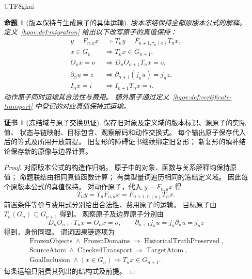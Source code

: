 \documentclass[12pt,a4paper,openany,notitlepage]{report}
\theoremstyle{plain}
\newtheorem{proposition}[theorem]{命题}
\theoremstyle{definition}
\newtheorem*{certificate}{证书}
\theoremstyle{remark}
\begin{document}
\begin{CJK*}{UTF8}{gkai}
\begin{proposition}[版本保持与生成原子的具体运输]
\label{hgov:prop:atomic-transport}
版本冻结保持全部原版本公式的解释。
定义~\ref{hgov:def:migration} 给出以下改写原子的真值保持：
\[
 \begin{aligned}
 y=F_{n,a}x
 &\Longrightarrow T_ny=F_{n+1,\tau_n(a)}T_nx,\\
 x\in G_n&\Longrightarrow T_nx\in G_{n+1},\\
 O_nx=o&\Longrightarrow D_nO_{n+1}T_nx=o,\\
 \partial_nu=z
 &\Longrightarrow \partial_{n+1}(j_nu)=j_nz,\\
 I_nx=i&\Longrightarrow I_{n+1}T_nx=i .
 \end{aligned}
\]
动作原子同时运输其合法性与费用。
额外原子通过定义~\ref{hgov:def:certificate-transport} 中登记的对应真值保持式运输。
\end{proposition}
\begin{certificate}[冻结域与原子交换见证]
保存旧对象及定义域的版本标识、源原子的实际值、
状态与链映射、目标包含、观察解码和动作交换式。
每个输出原子保存代入后的等式及所用开放前提。
旧复形的障碍证书继续绑定旧复形；
新复形的填补结论保存新的原像与边界计算。
\end{certificate}
\begin{proof}
对原版本公式的构造作归纳。
原子中的对象、函数与关系解释均保持原值；
命题联结由相同真值函数计算；
有类型量词遍历相同的冻结定义域。
因此每个原版本公式的真值保持。
对动作原子，代入 $y=F_{n,a}x$ 得
\[
 T_ny=T_nF_{n,a}x=F_{n+1,\tau_n(a)}T_nx.
\]
前置条件等价与费用式分别给出合法性、费用原子的运输。
目标原子由 $T_n(G_n)\subseteq G_{n+1}$ 得到。
观察原子及边界原子分别由
\[
 D_nO_{n+1}T_nx=O_nx=o,\qquad
 \partial_{n+1}j_nu=j_n\partial_nu=j_nz
\]
得到，身份同理。
谓词因果链逐项为
\[
 \begin{gathered}
 \operatorname{FrozenObjects}\land\operatorname{FrozenDomains}
 \Longrightarrow\operatorname{HistoricalTruthPreserved},\\
 \operatorname{SourceAtom}\land\operatorname{CheckedTransport}
 \Longrightarrow\operatorname{TargetAtom},\\
 \operatorname{GoalInclusion}\land(x\in G_n)
 \Longrightarrow T_nx\in G_{n+1}.
 \end{gathered}
\]
每条运输只消费其列出的结构式及前提。
\end{proof}


\end{CJK*}
\end{document}
